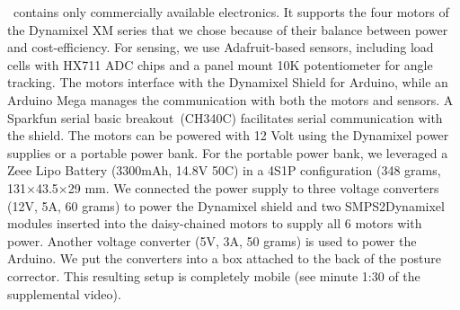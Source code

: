 \toolkit~contains only commercially available electronics. It supports the four motors of the Dynamixel XM series that we chose because of their balance between power and cost-efficiency. For sensing, we use Adafruit-based sensors, including load cells with HX711 ADC chips and a panel mount 10K potentiometer for angle tracking. The motors interface with the Dynamixel Shield for Arduino, while an Arduino Mega manages the communication with both the motors and sensors. A Sparkfun serial basic breakout~(CH340C) facilitates serial communication with the shield. The motors can be powered with 12 Volt using the Dynamixel power supplies or a portable power bank. %
For the portable power bank, we leveraged a Zeee Lipo Battery (3300mAh, 14.8V 50C) in a 4S1P configuration (348 grams, 131$\times$43.5$\times$29 mm. We connected the power supply to three voltage converters (12V, 5A, 60 grams) to power the Dynamixel shield and two SMPS2Dynamixel modules inserted into the daisy-chained motors to supply all 6 motors with power. Another voltage converter (5V, 3A, 50 grams) is used to power the Arduino. We put the converters into a box attached to the back of the posture corrector. This resulting setup is completely mobile (see minute 1:30 of the supplemental video).
